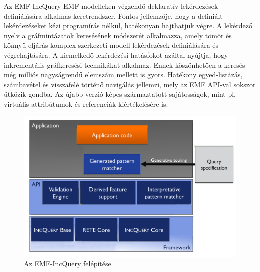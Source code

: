 Az EMF-IncQuery EMF modelleken végzendő deklaratív lekérdezések definiálására alkalmas keretrendszer.
Fontos jellemzője, hogy a definiált lekérdezéseket kézi programírás nélkül, hatékonyan hajthatjuk végre.
A lekérdező nyelv a gráfmintázatok keresésének módszerét alkalmazza, amely tömör és könnyű eljárás komplex szerkezeti modell-lekérdezések definiálására és végrehajtására.
A kiemelkedő lekérdezési hatásfokot azáltal nyújtja, hogy inkrementális gráfkeresési technikákat alkalmaz.
Ennek köszönhetően a keresés még milliós nagyságrendű elemszám mellett is gyors.
Hatékony egyed-listázás, számbavétel és visszafelé történő navigálás jellemzi, mely az EMF API-val sokszor ütközik gondba.
Az újabb verzió képes származtatott sajátosságok, mint pl. virtuális attribútumok és referenciák kiértékelésére is.

\begin{figure}[h]
\centering
\includegraphics[width=\textwidth]{figures/emf-incquery-structure.png}
\caption{Az EMF-IncQuery felépítése}
\label{fig:EMFIncQueryStructure}
\end{figure}

